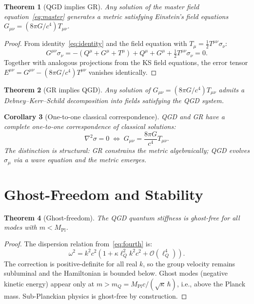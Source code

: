 \documentclass[11pt,a4paper]{article}
\theoremstyle{plain}
\newtheorem{theorem}{Theorem}[section]
\newtheorem{corollary}[theorem]{Corollary}
\theoremstyle{definition}
\theoremstyle{remark}
\newcommand{\lQ}{\ell_Q}
\newcommand{\mQ}{m_Q}
\newcommand{\Mpl}{M_{\mathrm{Pl}}}
\newcommand{\half}{\tfrac{1}{2}}
\begin{document}
\begin{theorem}[QGD implies GR]
\label{thm:forward}
Any solution of the master field equation~\eqref{eq:master} generates a metric
satisfying Einstein's field equations $G_{\mu\nu} = (8\pi G/c^4)T_{\mu\nu}$.
\end{theorem}

\begin{proof}
From identity~\eqref{eq:identity} and the field equation with
$T_\mu = \half T^{\mu\nu}\sigma_\nu$:
\[
  G^{\mu\nu}\sigma_\nu
  = -(Q^\mu + G^\mu + T^\mu) + Q^\mu + G^\mu + \half T^{\mu\nu}\sigma_\nu = 0.
\]
Together with analogous projections from the KS field equations, the error tensor
$E^{\mu\nu} = G^{\mu\nu} - (8\pi G/c^4)T^{\mu\nu}$ vanishes identically.
\end{proof}

\begin{theorem}[GR implies QGD]
\label{thm:reverse}
Any solution of $G_{\mu\nu} = (8\pi G/c^4)T_{\mu\nu}$ admits a Debney--Kerr--Schild
decomposition into fields satisfying the QGD system.
\end{theorem}

\begin{corollary}[One-to-one classical correspondence]
\label{cor:equiv}
QGD and GR have a complete one-to-one correspondence of classical solutions:
\begin{equation}
  \nabla^2\sigma = 0 \;\Longleftrightarrow\; G_{\mu\nu} = \frac{8\pi G}{c^4}T_{\mu\nu}.
\end{equation}
The distinction is structural: GR constrains the metric algebraically;
QGD evolves $\sigma_\mu$ via a wave equation and the metric emerges.
\end{corollary}

\section{Ghost-Freedom and Stability}
\label{sec:ghosts}

\begin{theorem}[Ghost-freedom]
\label{thm:ghost}
The QGD quantum stiffness is ghost-free for all modes with $m < \Mpl$.
\end{theorem}

\begin{proof}
The dispersion relation from~\eqref{eq:fourth} is:
\[
  \omega^2 = k^2c^2\!\left(1 + \kappa\lQ^2 k^2c^2 + \mathcal{O}(\lQ^4)\right).
\]
The correction is positive-definite for all real $k$, so the group velocity remains
subluminal and the Hamiltonian is bounded below.  Ghost modes (negative kinetic energy)
appear only at $m > \mQ = \Mpl c/(\sqrt{\kappa}\,\hbar)$, i.e., above the Planck mass.
Sub-Planckian physics is ghost-free by construction.
\end{proof}
\end{document}
